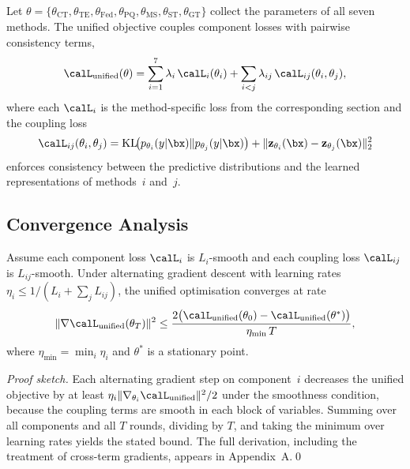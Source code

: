 Let $\theta=\{\theta_{\mathrm{CT}},\theta_{\mathrm{TE}},\theta_{\mathrm{Fed}},\theta_{\mathrm{PQ}},\theta_{\mathrm{MS}},\theta_{\mathrm{ST}},\theta_{\mathrm{GT}}\}$ collect the parameters of all seven methods. The unified objective couples component losses with pairwise consistency terms,
\begin{equation}
\calL_{\mathrm{unified}}(\theta)
= \sum_{i=1}^{7}\lambda_i\,\calL_i(\theta_i)
+ \sum_{i<j}\lambda_{ij}\,\calL_{ij}(\theta_i,\theta_j),
\label{eq:unified_obj}
\end{equation}
where each $\calL_i$ is the method-specific loss from the corresponding section and the coupling loss
\begin{equation}
\calL_{ij}(\theta_i,\theta_j)
= \mathrm{KL}\!\bigl(p_{\theta_i}(y|\bx)\|p_{\theta_j}(y|\bx)\bigr)
+ \|\mathbf{z}_{\theta_i}(\bx)-\mathbf{z}_{\theta_j}(\bx)\|_2^2
\label{eq:unified_coupling}
\end{equation}
enforces consistency between the predictive distributions and the learned representations of methods~$i$ and~$j$.

\subsection{Convergence Analysis}

\begin{theorem}
\label{thm:unified}
Assume each component loss $\calL_i$ is $L_i$-smooth and each coupling loss $\calL_{ij}$ is $L_{ij}$-smooth. Under alternating gradient descent with learning rates $\eta_i\le 1/(L_i+\sum_j L_{ij})$, the unified optimisation converges at rate
\begin{equation}
\|\nabla\calL_{\mathrm{unified}}(\theta_T)\|^2
\le \frac{2\bigl(\calL_{\mathrm{unified}}(\theta_0)
  -\calL_{\mathrm{unified}}(\theta^*)\bigr)}{\eta_{\min}\,T},
\label{eq:unified_conv}
\end{equation}
where $\eta_{\min}=\min_i\eta_i$ and $\theta^*$ is a stationary point.
\end{theorem}

\noindent\textit{Proof sketch.} Each alternating gradient step on component~$i$ decreases the unified objective by at least $\eta_i\|\nabla_{\theta_i}\calL_{\mathrm{unified}}\|^2/2$ under the smoothness condition, because the coupling terms are smooth in each block of variables. Summing over all components and all $T$ rounds, dividing by $T$, and taking the minimum over learning rates yields the stated bound. The full derivation, including the treatment of cross-term gradients, appears in Appendix~A.\qed


